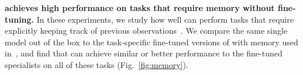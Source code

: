 \noindent \textbf{\MethodName{} achieves high performance on tasks that require memory without fine-tuning.}
In these experiments, we study how well \MethodName{} can perform tasks that require explicitly keeping track of previous observations~\citep{torne2026mem}. 
We compare the same single \MethodName{} model out of the box to the task-specific fine-tuned versions of \Pizs{} with memory used in~\citet{torne2026mem}, and find that \MethodName{} can achieve similar or better performance to the fine-tuned specialists on all of these tasks (Fig.~\ref{fig:memory}).

